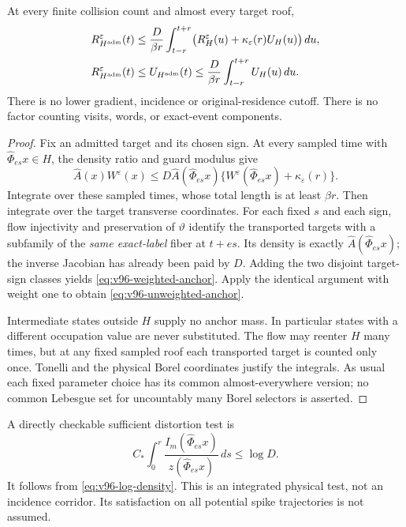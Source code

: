 \begin{theorem}
\label{thm:v96-anchor}
At every finite collision count and almost every target roof,
\begin{align}
 R_{H^{\rm adm}}^\varepsilon(t)
 &\le\frac{D}{\beta r}\int_{t-r}^{t+r}
        \bigl(R_H^\varepsilon(u)+\kappa_\varepsilon(r)U_H(u)\bigr)\,du,
                                                   \label{eq:v96-weighted-anchor}\\
 R_{H^{\rm adm}}^\varepsilon(t)
 &\le U_{H^{\rm adm}}(t)
 \le\frac{D}{\beta r}\int_{t-r}^{t+r}U_H(u)\,du.
                                                   \label{eq:v96-unweighted-anchor}
\end{align}
There is no lower gradient, incidence or original-residence cutoff.
There is no factor counting visits, words, or exact-event components.
\end{theorem}
\begin{proof}
Fix an admitted target and its chosen sign. At every sampled time
with $\widehat\Phi_{es}x\in H$, the density ratio and guard modulus give
\[
 \widehat A(x)W^\varepsilon(x)
 \le D\widehat A(\widehat\Phi_{es}x)
    \{W^\varepsilon(\widehat\Phi_{es}x)+\kappa_\varepsilon(r)\}.
\]
Integrate over these sampled times, whose total length is at least
$\beta r$. Then integrate over the target transverse coordinates.
For each fixed $s$ and each sign, flow injectivity and preservation of
$\vartheta$ identify the transported targets with a subfamily of the
\emph{same exact-label} fiber at $t+es$. Its density is exactly
$\widehat A(\widehat\Phi_{es}x)$; the inverse Jacobian has already
been paid by $D$. Adding the two disjoint target-sign classes yields
\eqref{eq:v96-weighted-anchor}. Apply the identical argument with
weight one to obtain \eqref{eq:v96-unweighted-anchor}.

Intermediate states outside $H$ supply no anchor mass. In particular
states with a different occupation value are never substituted. The
flow may reenter $H$ many times, but at any fixed sampled roof each
transported target is counted only once. Tonelli and the physical
Borel coordinates justify the integrals. As usual each fixed parameter
choice has its common almost-everywhere version; no common Lebesgue
set for uncountably many Borel selectors is asserted.
\end{proof}

A directly checkable sufficient distortion test is
\[
 C_*\int_0^r\frac{I_m(\widehat\Phi_{es}x)}
                      {z(\widehat\Phi_{es}x)}\,ds\le\log D.
\]
It follows from \eqref{eq:v96-log-density}. This is an integrated
physical test, not an incidence corridor. Its satisfaction on all
potential spike trajectories is not assumed.
